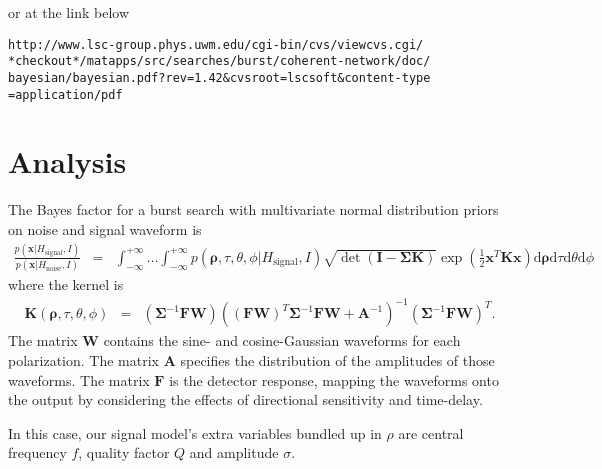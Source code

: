 \documentclass{article}
\begin{document}
or at the link below

\begin{verbatim}
http://www.lsc-group.phys.uwm.edu/cgi-bin/cvs/viewcvs.cgi/
*checkout*/matapps/src/searches/burst/coherent-network/doc/
bayesian/bayesian.pdf?rev=1.42&cvsroot=lscsoft&content-type
=application/pdf
\end{verbatim}

\section{Analysis}
The Bayes factor for a burst search with multivariate normal distribution priors on noise and signal waveform is
\begin{eqnarray}
\frac{
p(\mathbf{x}|H_\textrm{signal},I)
}{
p(\mathbf{x}|H_\textrm{noise},I)
}
&=&
\int_{-\infty}^{+\infty}\ldots\int_{-\infty}^{+\infty}
p(\mathbf{\rho},\tau,\theta,\phi|H_\textrm{signal},I)
\sqrt{\det(\mathbf{I}-\mathbf{\Sigma}\mathbf{K})}
\exp(\frac{1}{2}\mathbf{x}^T\mathbf{K}\mathbf{x})
\mathrm{d}\mathbf{\rho}\mathrm{d}\tau\mathrm{d}\theta\mathrm{d}\phi\nonumber
\end{eqnarray}
where the kernel is
\begin{eqnarray}
\mathbf{K}(\mathbf{\rho},\tau,\theta,\phi)&=&
(\mathbf{\Sigma}^{-1}\mathbf{F}\mathbf{W})
(
(\mathbf{F}\mathbf{W})^T
\mathbf{\Sigma}^{-1}
\mathbf{F}\mathbf{W}
+
\mathbf{A}^{-1}
)^{-1}
(\mathbf{\Sigma}^{-1}\mathbf{F}\mathbf{W})^T.\nonumber
\end{eqnarray}
The matrix $\mathbf{W}$ contains the sine- and cosine-Gaussian waveforms for each polarization.  The matrix $\mathbf{A}$ specifies the distribution of the amplitudes of those waveforms.  The matrix $\mathbf{F}$ is the detector response, mapping the waveforms onto the output by considering the effects of directional sensitivity and time-delay.

In this case, our signal model's extra variables bundled up in $\rho$ are central frequency $f$, quality factor $Q$ and amplitude $\sigma$.
\end{document}
